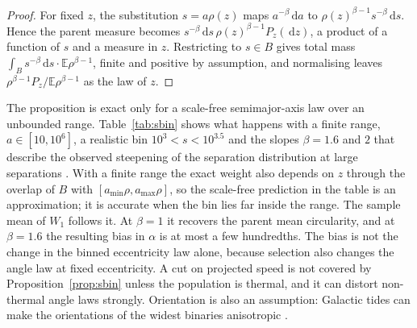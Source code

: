 \documentclass[11pt,a4paper]{article}
\theoremstyle{remark}\newtheorem{remark}[theorem]{Remark}
\newcommand{\E}{\mathbb E}
\newcommand{\dd}{\,\mathrm d}
\begin{document}
\begin{proof}
For fixed $z$, the substitution $s=a\rho(z)$ maps $a^{-\beta}\dd a$ to $\rho(z)^{\beta-1}s^{-\beta}\dd s$. Hence the parent measure becomes $s^{-\beta}\dd s\,\rho(z)^{\beta-1}P_z(\dd z)$, a product of a function of $s$ and a measure in $z$. Restricting to $s\in B$ gives total mass $\int_Bs^{-\beta}\dd s\cdot\E\rho^{\beta-1}$, finite and positive by assumption, and normalising leaves $\rho^{\beta-1}P_z/\E\rho^{\beta-1}$ as the law of $z$.
\end{proof}

The proposition is exact only for a scale-free semimajor-axis law over an unbounded range. Table~\ref{tab:sbin} shows what happens with a finite range, $a\in[10,10^6]$, a realistic bin $10^3<s<10^{3.5}$ and the slopes $\beta=1.6$ and $2$ that describe the observed steepening of the separation distribution at large separations \citep{ElBadry2021}. With a finite range the exact weight also depends on $z$ through the overlap of $B$ with $[a_{\min}\rho,a_{\max}\rho]$, so the scale-free prediction in the table is an approximation; it is accurate when the bin lies far inside the range. The sample mean of $W_1$ follows it. At $\beta=1$ it recovers the parent mean circularity, and at $\beta=1.6$ the resulting bias in $\alpha$ is at most a few hundredths. The bias is not the change in the binned eccentricity law alone, because selection also changes the angle law at fixed eccentricity. A cut on projected speed is not covered by Proposition~\ref{prop:sbin} unless the population is thermal, and it can distort non-thermal angle laws strongly. Orientation is also an assumption: Galactic tides can make the orientations of the widest binaries anisotropic \citep{Hamilton2022}.
\end{document}
